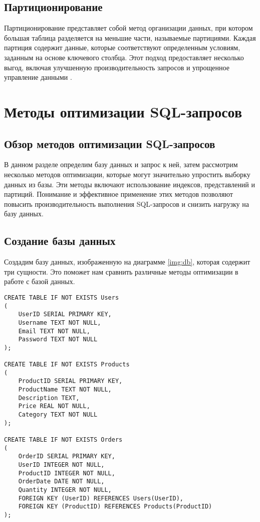 \documentclass{bmstu}
\begin{document}
\section{Партиционирование}
Партиционирование представляет собой метод организации данных, 
при котором большая таблица разделяется на меньшие части, называемые партициями. 
Каждая партиция содержит данные, которые соответствуют определенным условиям, 
заданным на основе ключевого столбца. Этот подход предоставляет несколько выгод, 
включая улучшенную производительность запросов и упрощенное управление данными \cite{tenthOptSQL}.


\chapter{Методы оптимизации SQL-запросов}
\section{Обзор методов оптимизации SQL-запросов}
В данном разделе определим базу данных и запрос к ней, затем рассмотрим несколько методов 
оптимизации, которые могут значительно 
упростить выборку данных из базы. Эти методы включают использование индексов, представлений и партиций. 
Понимание и эффективное применение этих методов позволяют 
повысить производительность выполнения SQL-запросов и снизить нагрузку на 
базу данных.

\section*{Создание базы данных}
Создадим базу данных, изображенную на диаграмме \ref{img:db}, которая содержит три сущности. Это поможет нам сравнить различные методы оптимизации в работе с базой данных.
\clearpage

\begin{lstlisting}[caption={Создание сущностей}, label=lst:db]
CREATE TABLE IF NOT EXISTS Users
(
    UserID SERIAL PRIMARY KEY,
    Username TEXT NOT NULL,
    Email TEXT NOT NULL,
    Password TEXT NOT NULL
);

CREATE TABLE IF NOT EXISTS Products
(
    ProductID SERIAL PRIMARY KEY,
    ProductName TEXT NOT NULL,
    Description TEXT,
    Price REAL NOT NULL,
    Category TEXT NOT NULL
);

CREATE TABLE IF NOT EXISTS Orders
(
    OrderID SERIAL PRIMARY KEY,
    UserID INTEGER NOT NULL,
    ProductID INTEGER NOT NULL,
    OrderDate DATE NOT NULL,
    Quantity INTEGER NOT NULL,
    FOREIGN KEY (UserID) REFERENCES Users(UserID),
    FOREIGN KEY (ProductID) REFERENCES Products(ProductID)
);
\end{lstlisting}
\end{document}
